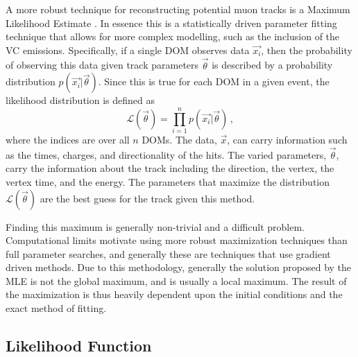 A more robust technique for reconstructing potential muon tracks is a Maximum Likelihood Estimate \cite{llh_text}. In essence this is a statistically driven parameter fitting technique that allows for more complex modelling, such as the inclusion of the VC emissions. Specifically, if a single DOM observes data $\vec{x_{i}}$, then the probability of observing this data given track parameters $\vec{\theta}$ is described by a probability distribution $p\left(\vec{x_{i}}\bigr\rvert\vec{\theta}\right)$. Since this is true for each DOM in a given event, the likelihood distribution is defined as
\begin{equation}
  \mathcal{L}(\vec{\theta}) = \prod_{i=1}^{n}p\left(\vec{x_{i}}\bigr\rvert\vec{\theta}\right)\, ,
\end{equation}
where the indices are over all $n$ DOMs. The data, $\vec{x}$, can carry information such as the times, charges, and directionality of the hits. The varied parameters, $\vec{\theta}$, carry the information about the track including the direction, the vertex, the vertex time, and the energy. The parameters that maximize the distribution $\mathcal{L}(\vec{\theta})$ are the best guess for the track given this method.

Finding this maximum is generally non-trivial and a difficult problem. Computational limits motivate using more robust maximization techniques than full parameter searches, and generally these are techniques that use gradient driven methods. Due to this methodology, generally the solution proposed by the MLE is not the global maximum, and is usually a local maximum. The result of the maximization is thus heavily dependent upon the initial conditions and the exact method of fitting.

\subsection{Likelihood Function}

